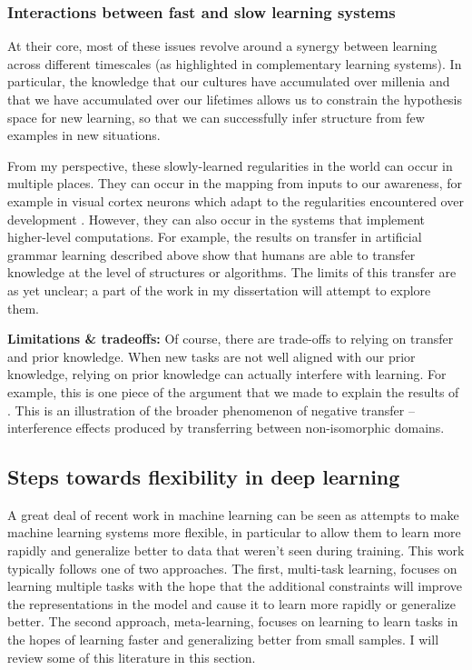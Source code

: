 \documentclass[11pt]{article}
\begin{document}
\subsubsection{Interactions between fast and slow learning systems}
At their core, most of these issues revolve around a synergy between learning across different timescales (as highlighted in complementary learning systems). In particular, the knowledge that our cultures have accumulated over millenia and that we have accumulated over our lifetimes allows us to constrain the hypothesis space for new learning, so that we can successfully infer structure from few examples in new situations. \par 
From my perspective, these slowly-learned regularities in the world can occur in multiple places. They can occur in the mapping from inputs to our awareness, for example in visual cortex neurons which adapt to the regularities encountered over development \citep{Barlow1975}. However, they can also occur in the systems that implement higher-level computations. For example, the results on transfer in artificial grammar learning described above \citep[e.g.]{Tunney2001} show that humans are able to transfer knowledge at the level of structures or algorithms. The limits of this transfer are as yet unclear; a part of the work in my dissertation will attempt to explore them. \par  

\textbf{Limitations \& tradeoffs:} Of course, there are trade-offs to relying on transfer and prior knowledge. When new tasks are not well aligned with our prior knowledge, relying on prior knowledge can actually interfere with learning. For example, this is one piece of the argument that we made \citep{Lampinen2017b} to explain the results of \citet{Kaminski2008}. This is an illustration of the broader phenomenon of negative transfer -- interference effects produced by transferring between non-isomorphic domains. \par


\subsection{Steps towards flexibility in deep learning}

A great deal of recent work in machine learning can be seen as attempts to make machine learning systems more flexible, in particular to allow them to learn more rapidly and generalize better to data that weren't seen during training. This work typically follows one of two approaches. The first, multi-task learning, focuses on learning multiple tasks with the hope that the additional constraints will improve the representations in the model and cause it to learn more rapidly or generalize better. The second approach, meta-learning, focuses on learning to learn tasks in the hopes of learning faster and generalizing better from small samples. I will review some of this literature in this section.
\end{document}
